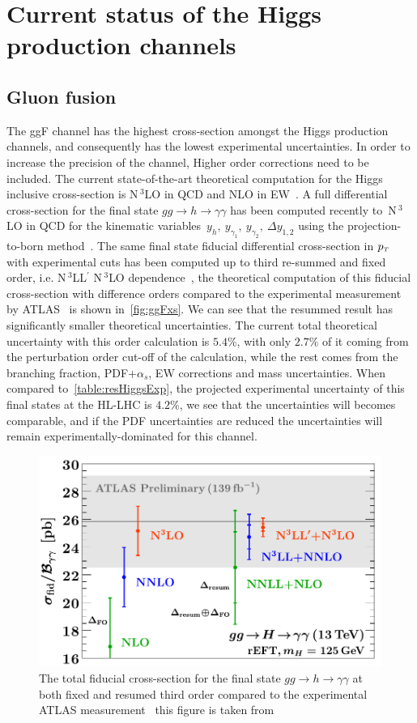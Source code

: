 \section{Current status of the Higgs production channels  \label{sec:singlehiggschannels}  }
\subsection{Gluon fusion}
The ggF channel has the highest cross-section amongst the Higgs production channels, and consequently has the lowest experimental uncertainties. In order to increase the precision of the channel, Higher order corrections need to be included. The current state-of-the-art theoretical computation for the Higgs inclusive cross-section is N$\,^3$LO in QCD and NLO in EW~\cite{Bonetti:2018ukf}. A full differential cross-section for the final state $ gg \to h \to \gamma \gamma$ has been computed recently to~N$\,^3$LO in QCD for the kinematic variables~$y_h, \ y_{\gamma_1},\ y_{\gamma_2},\ \Delta y_{1,2}$ using the projection-to-born method~\cite{Chen:2021isd}. The same final state fiducial differential cross-section in $p_{\scriptscriptstyle T}$ with experimental cuts has been computed up to third re-summed and fixed order, i.e.  N$\,^3$LL$^\prime$   N$\,^3$LO dependence~\cite{Billis:2021ecs}, the theoretical computation of this fiducial cross-section with difference orders compared to the experimental measurement by ATLAS~\cite{ATLAS:2019jst} is shown in~\autoref{fig:ggFxs}. We can see that the resummed result has significantly smaller theoretical uncertainties. The current total theoretical uncertainty with this order calculation is $5.4 \%$, with only $2.7\%$ of it coming from the perturbation order cut-off of the calculation, while the rest comes from the branching fraction, PDF+$\alpha_s$, EW corrections and mass uncertainties. When compared to~\autoref{table:resHiggsExp}, the projected experimental uncertainty of this final states at the HL-LHC is $4.2\%$, we see that the uncertainties will becomes comparable, and if the PDF uncertainties are reduced the uncertainties will remain experimentally-dominated for this channel. 
\begin{figure}[htbp!]
	\begin{center}
		\includegraphics[width=.7\textwidth]{figures/total_xs_fid}
		\caption{ The total fiducial cross-section for the final state  $ gg \to h \to \gamma \gamma$ at both fixed and resumed third order compared to the experimental ATLAS measurement~\cite{ATLAS:2019jst} this figure is taken from~\cite{Billis:2021ecs} \label{fig:ggFxs} }
	\end{center}
\end{figure}
